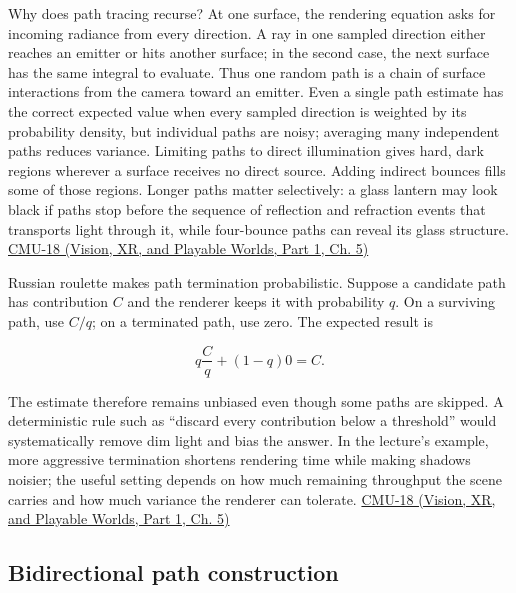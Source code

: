 Why does path tracing recurse? At one surface, the rendering equation asks for incoming radiance from every direction. A ray in one sampled direction either reaches an emitter or hits another surface; in the second case, the next surface has the same integral to evaluate. Thus one random path is a chain of surface interactions from the camera toward an emitter. Even a single path estimate has the correct expected value when every sampled direction is weighted by its probability density, but individual paths are noisy; averaging many independent paths reduces variance. Limiting paths to direct illumination gives hard, dark regions wherever a surface receives no direct source. Adding indirect bounces fills some of those regions. Longer paths matter selectively: a glass lantern may look black if paths stop before the sequence of reflection and refraction events that transports light through it, while four-bounce paths can reveal its glass structure. \href{../07-Vision-XR-and-Playable-Worlds-P01/main.pdf\#nameddest=04-visual-computing-ii-ch036-cmu-18---monte-carlo-rendering}{CMU-18 (Vision, XR, and Playable Worlds, Part 1, Ch. 5)}

Russian roulette makes path termination probabilistic. Suppose a candidate path has contribution \(C\) and the renderer keeps it with probability \(q\). On a surviving path, use \(C/q\); on a terminated path, use zero. The expected result is

\[
q\frac{C}{q}+(1-q)0=C.
\]

The estimate therefore remains unbiased even though some paths are skipped. A deterministic rule such as ``discard every contribution below a threshold'' would systematically remove dim light and bias the answer. In the lecture's example, more aggressive termination shortens rendering time while making shadows noisier; the useful setting depends on how much remaining throughput the scene carries and how much variance the renderer can tolerate. \href{../07-Vision-XR-and-Playable-Worlds-P01/main.pdf\#nameddest=04-visual-computing-ii-ch036-cmu-18---monte-carlo-rendering}{CMU-18 (Vision, XR, and Playable Worlds, Part 1, Ch. 5)}

\subsection{Bidirectional path construction}\label{03-visual-computing-i-ch011-bidirectional-path-construction}

\hypertarget{03-visual-computing-i-ch011-bidirectional-path-construction}{}

